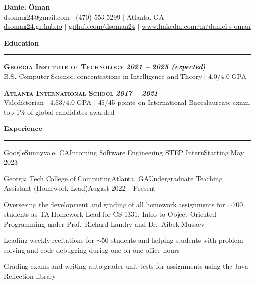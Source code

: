\documentclass{article}
\newcommand{\horizontal}{\vspace{2pt}\hrule}
\newcommand{\school}[3]{\vspace{2pt}\textsc{\textbf{#1}} \hfill \textbf{\textit{#2}} \\ #3}
\newcommand{\sectitle}[1]{\vspace{2pt} \textbf{\large #1} \horizontal}
\begin{document}
\thispagestyle{empty}
\begin{center}
    \textbf{\LARGE Daniel Öman} \\
    dsoman24@gmail.com $|$ (470) 553-5299 $|$ Atlanta, GA \\
    \href{https://dsoman24.github.io/}{dsoman24.github.io} $|$ \href{https://github.com/dsoman24}{github.com/dsoman24} $|$ \href{https://www.linkedin.com/in/daniel-s-oman/}{www.linkedin.com/in/daniel-s-oman}
\end{center}

\begin{flushleft}
\sectitle{Education}

\school{Georgia Institute of Technology}{2021 -- 2025 (expected)}
{B.S. Computer Science, concentrations in Intelligence and Theory $|$ 4.0/4.0 GPA}

\school{Atlanta International School}{2017 -- 2021}
{Valedictorian $|$ 4.53/4.0 GPA $|$ 45/45 points on International Baccalaureate exam, top 1\% of global candidates awarded}

\sectitle{Experience}

    \begin{experience_no_list}{Google}{Sunnyvale, CA}{Incoming Software Engineering STEP Intern}{Starting May 2023}
    \end{experience_no_list}

    \begin{experience}{Georgia Tech College of Computing}{Atlanta, GA}{Undergraduate Teaching Assistant (Homework Lead)}{August 2022 -- Present}
        \item Overseeing the development and grading of all homework assignments for $\sim$700 students as TA Homework Lead for CS 1331: Intro to Object-Oriented Programming under Prof.~Richard Landry and Dr.~Aibek Musaev
        \item Leading weekly recitations for $\sim$50 students and helping students with problem-solving and code debugging during one-on-one office hours
        \item Grading exams and writing auto-grader unit tests for assignments using the Java Reflection library
    \end{experience}


\end{flushleft}
\end{document}
